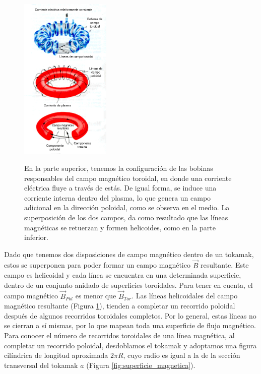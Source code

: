 \documentclass[../main.tex]{subfiles}
\begin{document}
        \begin{figure} 
        \caption{En la parte superior, tenemos la configuración de las bobinas responsables del campo magnético toroidal, en donde una corriente eléctrica fluye a través de estás. De igual forma, se induce una corriente interna dentro del plasma, lo que genera un campo adicional en la dirección poloidal, como se observa en el medio. La superposición de los dos campos, da como resultado que las líneas magnéticas se retuerzan y formen helicoides, como en la parte inferior.}
        \includegraphics[width=0.385\textwidth]{Images/camp_toroidal_poloidal.jpg}
        \label{fig:lineas_magneticas_tor_pol}
        \end{figure}
        
	    Dado que tenemos dos disposiciones de campo magnético dentro de un tokamak, estos se superponen para poder formar un campo magnético 
        $\vec B$ resultante. Este campo es helicoidal y cada línea se encuentra en una determinada superficie, dentro de un conjunto anidado
        de superficies toroidales. Para tener en cuenta, el campo magnético $\vec B_{Pol}$ es menor que $\vec B_{Tor}$. Las líneas helicoidales del campo magnético
        resultante (Figura \ref{fig:lineas_magneticas_tor_pol}), tienden a completar un recorrido poloidal después de algunos recorridos toroidales completos. Por lo general, estas líneas
        no se cierran a sí mismas, por lo que mapean toda una superficie de flujo magnético. Para conocer el número de recorridos 
        toroidales de una línea magnética, al completar un recorrido poloidal, desdoblamos el tokamak y adoptamos una figura cilíndrica de  
        longitud aproximada $2\pi R$, cuyo radio es igual a la de la sección transversal del tokamak $a$ (Figura \ref{fig:superficie_magnetica}). \\
\end{document}
